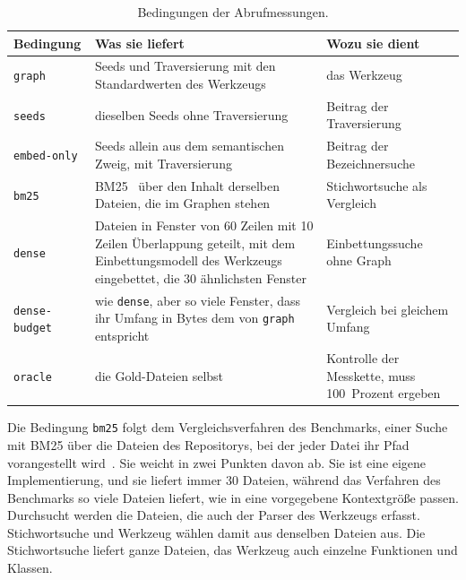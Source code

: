 \begin{table}[H]
  \centering
  \caption{Bedingungen der Abrufmessungen.}
  \label{tab:abrufbedingungen}
  \footnotesize
  \begin{tabularx}{\textwidth}{>{\raggedright\arraybackslash}p{2.2cm}>{\raggedright\arraybackslash}X>{\raggedright\arraybackslash}p{4.6cm}}
    \toprule
    Bedingung & Was sie liefert & Wozu sie dient \\
    \midrule
    \texttt{graph} & Seeds und Traversierung mit den Standardwerten des Werkzeugs & das Werkzeug \\
    \texttt{seeds} & dieselben Seeds ohne Traversierung & Beitrag der Traversierung \\
    \texttt{embed-only} & Seeds allein aus dem semantischen Zweig, mit Traversierung & Beitrag der Bezeichnersuche \\
    \texttt{bm25} & BM25~\parencite{robertson2009bm25} über den Inhalt derselben Dateien, die im Graphen stehen & Stichwortsuche als Vergleich \\
    \texttt{dense} & Dateien in Fenster von 60 Zeilen mit 10 Zeilen Überlappung geteilt, mit dem Einbettungsmodell des Werkzeugs eingebettet, die 30 ähnlichsten Fenster & Einbettungssuche ohne Graph \\
    \texttt{dense-budget} & wie \texttt{dense}, aber so viele Fenster, dass ihr Umfang in Bytes dem von \texttt{graph} entspricht & Vergleich bei gleichem Umfang \\
    \texttt{oracle} & die Gold-Dateien selbst & Kontrolle der Messkette, muss 100~Prozent ergeben \\
    \bottomrule
  \end{tabularx}
\end{table}

Die Bedingung \texttt{bm25} folgt dem Vergleichsverfahren des Benchmarks, einer Suche mit BM25 über die Dateien des Repositorys, bei der jeder Datei ihr Pfad vorangestellt wird~\parencite{jimenez2024swebench}. Sie weicht in zwei Punkten davon ab. Sie ist eine eigene Implementierung, und sie liefert immer 30 Dateien, während das Verfahren des Benchmarks so viele Dateien liefert, wie in eine vorgegebene Kontextgröße passen. Durchsucht werden die Dateien, die auch der Parser des Werkzeugs erfasst. Stichwortsuche und Werkzeug wählen damit aus denselben Dateien aus. Die Stichwortsuche liefert ganze Dateien, das Werkzeug auch einzelne Funktionen und Klassen.

